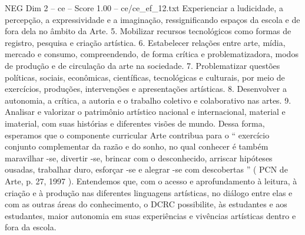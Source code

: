 \begin{textsample}{NEG Dim 2 – ce – Score 1.00 – ce/ce\_ef\_12.txt}
Experienciar a ludicidade, a percepção, a expressividade e a imaginação, ressignificando espaços da escola e de fora dela no âmbito da Arte. 5.
Mobilizar recursos tecnológicos como formas de registro, pesquisa e criação artística. 6.
Estabelecer relações entre arte, mídia, mercado e consumo, compreendendo, de forma crítica e problematizadora, modos de produção e de circulação da arte na sociedade. 7.
Problematizar questões políticas, sociais, econômicas, científicas, tecnológicas e culturais, por meio de exercícios, produções, intervenções e apresentações artísticas. 8.
Desenvolver a autonomia, a crítica, a autoria e o trabalho coletivo e colaborativo nas artes. 9.
Analisar e valorizar o patrimônio artístico nacional e internacional, material e imaterial, com suas histórias e diferentes visões de mundo.
Dessa forma, esperamos que o componente curricular Arte contribua para o “ exercício conjunto complementar da razão e do sonho, no qual conhecer é também maravilhar -se, divertir -se, brincar com o desconhecido, arriscar hipóteses ousadas, trabalhar duro, esforçar -se e alegrar -se com descobertas ” ( PCN de Arte, p. 27, 1997 ).
Entendemos que, com o acesso e aprofundamento à leitura, à criação e à produção nas diferentes linguagens artísticas, no diálogo entre elas e com as outras áreas do conhecimento, o DCRC possibilite, às estudantes e aos estudantes, maior autonomia em suas experiências e vivências artísticas dentro e fora da escola.

\end{textsample}
